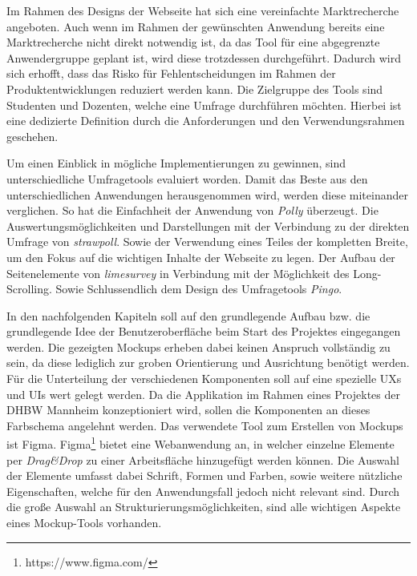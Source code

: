 Im Rahmen des Designs der Webseite hat sich eine vereinfachte Marktrecherche angeboten. 
Auch wenn im Rahmen der gewünschten Anwendung bereits eine Marktrecherche nicht direkt notwendig ist, da das Tool für eine abgegrenzte Anwendergruppe geplant ist, wird diese trotzdessen durchgeführt. 
Dadurch wird sich erhofft, dass das Risko für Fehlentscheidungen im Rahmen der Produktentwicklungen reduziert werden kann.\autocite{Pioch2019}
Die Zielgruppe des Tools sind Studenten und Dozenten, welche eine Umfrage durchführen möchten. 
Hierbei ist eine dedizierte Definition durch die Anforderungen und den Verwendungsrahmen geschehen. 

Um einen Einblick in mögliche Implementierungen zu gewinnen, sind unterschiedliche Umfragetools evaluiert worden. 
Damit das Beste aus den unterschiedlichen Anwendungen herausgenommen wird, werden diese miteinander verglichen.
So hat die Einfachheit der Anwendung von \emph{Polly} überzeugt.
Die Auswertungsmöglichkeiten und Darstellungen mit der Verbindung zu der direkten Umfrage von \emph{strawpoll}. 
Sowie der Verwendung eines Teiles der kompletten Breite, um den Fokus auf die wichtigen Inhalte der Webseite zu legen. 
Der Aufbau der Seitenelemente von \emph{limesurvey} in Verbindung mit der Möglichkeit des Long-Scrolling.
Sowie Schlussendlich dem Design des Umfragetools \emph{Pingo}.  

In den nachfolgenden Kapiteln soll auf den grundlegende Aufbau bzw. die grundlegende Idee der Benutzeroberfläche beim Start des Projektes eingegangen werden. 
Die gezeigten Mockups erheben dabei keinen Anspruch vollständig zu sein, da diese lediglich zur groben Orientierung und Ausrichtung benötigt werden.
Für die Unterteilung der verschiedenen Komponenten soll auf eine spezielle \acfp{UX} und \acfp{UI} wert gelegt werden. 
Da die Applikation im Rahmen eines Projektes der DHBW Mannheim konzeptioniert wird, sollen die Komponenten an dieses Farbschema angelehnt werden. 
Das verwendete Tool zum Erstellen von Mockups ist Figma.
Figma\footnote{https://www.figma.com/} bietet eine Webanwendung an, in welcher einzelne Elemente per \emph{Drag\&Drop} zu einer Arbeitsfläche hinzugefügt werden können.
Die Auswahl der Elemente umfasst dabei Schrift, Formen und Farben, sowie weitere nützliche Eigenschaften, welche für den Anwendungsfall jedoch nicht relevant sind.
Durch die große Auswahl an Strukturierungsmöglichkeiten, sind alle wichtigen Aspekte eines Mockup-Tools vorhanden.